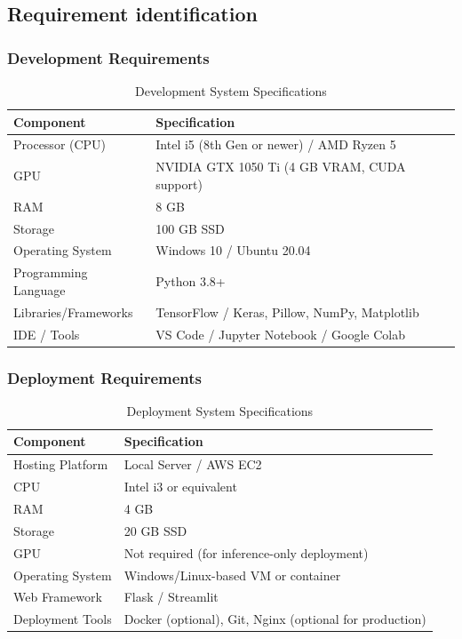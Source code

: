 \subsection{Requirement identification}
\subsubsection{Development Requirements}

\begin{table}[h!]
\centering
\caption{Development System Specifications}
\begin{tabularx}{\textwidth}{@{} l X @{}}
\toprule
\textbf{Component} & \textbf{Specification} \\
\midrule
Processor (CPU) & Intel i5 (8th Gen or newer) / AMD Ryzen 5 \\
GPU & NVIDIA GTX 1050 Ti (4 GB VRAM, CUDA support) \\
RAM & 8 GB \\
Storage & 100 GB SSD \\
Operating System & Windows 10 / Ubuntu 20.04 \\
Programming Language & Python 3.8+ \\
Libraries/Frameworks & TensorFlow / Keras, Pillow, NumPy, Matplotlib \\
IDE / Tools & VS Code / Jupyter Notebook / Google Colab \\
\bottomrule
\end{tabularx}
\end{table}

\subsubsection{Deployment Requirements}

\begin{table}[h!]
\centering
\caption{Deployment System Specifications}
\begin{tabularx}{\textwidth}{@{} l X @{}}
\toprule
\textbf{Component} & \textbf{Specification} \\
\midrule
Hosting Platform & Local Server / AWS EC2 \\
CPU & Intel i3 or equivalent \\
RAM & 4 GB \\
Storage & 20 GB SSD \\
GPU & Not required (for inference-only deployment) \\
Operating System & Windows/Linux-based VM or container \\
Web Framework & Flask / Streamlit \\
Deployment Tools & Docker (optional), Git, Nginx (optional for production) \\
\bottomrule
\end{tabularx}
\end{table}

